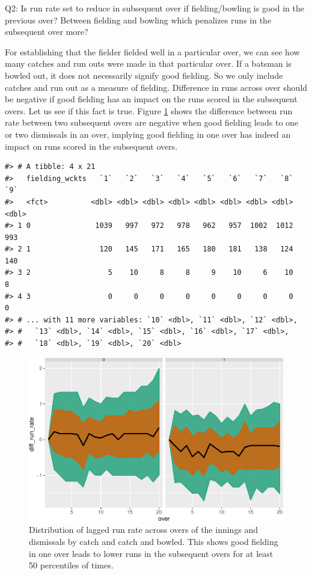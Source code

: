 \documentclass[12pt]{article}
\begin{document}
Q2: Is run rate set to reduce in subsequent over if fielding/bowling is
good in the previous over? Between fielding and bowling which penalizes
runs in the subsequent over more?

For establishing that the fielder fielded well in a particular over, we
can see how many catches and run outs were made in that particular over.
If a batsman is bowled out, it does not necessarily signify good
fielding. So we only include catches and run out as a measure of
fielding. Difference in runs across over should be negative if good
fielding has an impact on the runs scored in the subsequent overs. Let
us see if this fact is true. Figure \ref{fig:field} shows the difference
between run rate between two subsequent overs are negative when good
fielding leads to one or two dismissals in an over, implying good
fielding in one over has indeed an impact on runs scored in the
subsequent overs.

\begin{verbatim}
#> # A tibble: 4 x 21
#>   fielding_wckts   `1`   `2`   `3`   `4`   `5`   `6`   `7`   `8`   `9`
#>   <fct>          <dbl> <dbl> <dbl> <dbl> <dbl> <dbl> <dbl> <dbl> <dbl>
#> 1 0               1039   997   972   978   962   957  1002  1012   993
#> 2 1                120   145   171   165   180   181   138   124   140
#> 3 2                  5    10     8     8     9    10     6    10     8
#> 4 3                  0     0     0     0     0     0     0     0     0
#> # ... with 11 more variables: `10` <dbl>, `11` <dbl>, `12` <dbl>,
#> #   `13` <dbl>, `14` <dbl>, `15` <dbl>, `16` <dbl>, `17` <dbl>,
#> #   `18` <dbl>, `19` <dbl>, `20` <dbl>
\end{verbatim}

\begin{figure}

{\centering \includegraphics[width=\textwidth]{figure/field-1} 

}

\caption{Distribution of lagged run rate across overs of the innings and dismissals by catch and catch and bowled. This shows good fielding in one over leads to lower runs in the subsequent overs for at least 50 percentiles of times.}\label{fig:field}
\end{figure}
\end{document}
